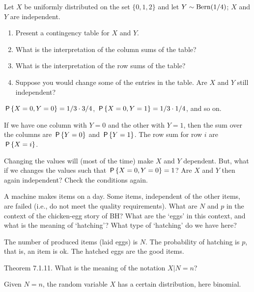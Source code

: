 \begin{exercise}
Let $X$ be uniformly distributed on the set $\{0,1,2\}$ and let $Y \sim \Bern{1/4}$; $X$ and $Y$ are independent.
\begin{enumerate}
\item Present a contingency table for $X$ and $Y$.
\item What is the interpretation of the column sums of the table?
\item What is the interpretation of the row sums of the table?
\item Suppose you would change some of the entries in the table. Are $X$ and $Y$ still independent?
\end{enumerate}
\begin{solution}
$\P{X=0, Y=0} = 1/3 \cdot 3/4$,
$\P{X=0, Y=1} = 1/3 \cdot 1/4$, and so on.

If we have one column with $Y=0$ and the other with $Y=1$, then the sum over the columns are $\P{Y=0}$ and $\P{Y=1}$. The row sum for row $i$ are  $\P{X=i}$.

Changing the values will (most of the time) make $X$ and $Y$ dependent. But, what if we changes the values such that  $\P{X=0, Y=0} =1$? Are $X$ and $Y$ then again independent? Check the conditions again.
\end{solution}
\end{exercise}


\begin{exercise}
A machine makes items on a day.
Some items, independent of the other items, are failed (i.e., do not meet the quality requirements).
What are $N$ and  $p$ in the context of the chicken-egg story of BH? What are the `eggs' in this context, and what is the meaning of `hatching'?
What type of `hatching' do we have here?
\begin{solution}
  The number of produced items (laid eggs) is $N$. The probability of hatching is $p$, that is, an item is ok. The hatched eggs are the good items.
\end{solution}
\end{exercise}



\begin{exercise}
Theorem 7.1.11. What is the meaning of the notation $X|N=n$?
\begin{solution}
  Given $N=n$, the random variable $X$ has a certain distribution, here binomial.
\end{solution}
\end{exercise}


